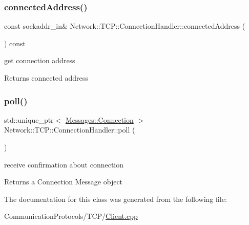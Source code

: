 \subsubsection{\texorpdfstring{connected\+Address()}{connectedAddress()}}
{\footnotesize\ttfamily const sockaddr\+\_\+in\& Network\+::\+T\+C\+P\+::\+Connection\+Handler\+::connected\+Address (\begin{DoxyParamCaption}{ }\end{DoxyParamCaption}) const\hspace{0.3cm}{\ttfamily [inline]}}



get connection address 

\begin{DoxyReturn}{Returns}
connected address 
\end{DoxyReturn}
\mbox{\label{class_network_1_1_t_c_p_1_1_connection_handler_acada6e8c41b8391d31649393fda5fac2}} 
\subsubsection{\texorpdfstring{poll()}{poll()}}
{\footnotesize\ttfamily std\+::unique\+\_\+ptr$<$ \hyperlink{class_network_1_1_messages_1_1_connection}{Messages\+::\+Connection} $>$ Network\+::\+T\+C\+P\+::\+Connection\+Handler\+::poll (\begin{DoxyParamCaption}{ }\end{DoxyParamCaption})}



receive confirmation about connection 

\begin{DoxyReturn}{Returns}
a Connection Message object 
\end{DoxyReturn}


The documentation for this class was generated from the following file\+:\begin{DoxyCompactItemize}
\item 
Communication\+Protocols/\+T\+C\+P/\hyperlink{_client_8cpp}{Client.\+cpp}\end{DoxyCompactItemize}
